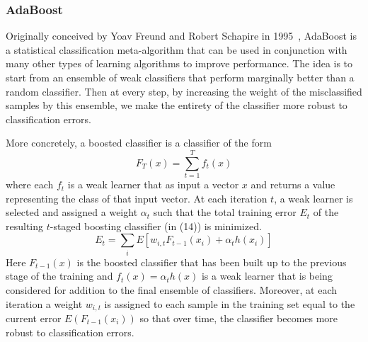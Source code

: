 \documentclass[journal,onecolumn]{IEEEtran}
\begin{document}
\subsubsection{AdaBoost}
Originally conceived by Yoav Freund and Robert Schapire in 1995~\cite{adaboost}, AdaBoost is a statistical classification meta-algorithm 
that can be used in conjunction with many other types of learning algorithms to improve performance. The idea is to start from an ensemble of 
weak classifiers that perform marginally better than a random classifier. Then at every step, by increasing the weight of the misclassified samples
by this ensemble, we make the entirety of the classifier more robust to classification errors. 

More concretely, a boosted classifier is a classifier of the form
\begin{equation}
  F_T(x) = \sum_{t=1}^T f_t(x)
\end{equation}
where each $f_t$ is a weak learner that as input a vector $x$ and returns a value representing the class of that input vector.
At each iteration $t$, a weak learner is selected and assigned a weight $\alpha_t$ such that the total training
error $E_t$ of the resulting $t$-staged boosting classifier (in (14)) is minimized.
\begin{equation}
  E_t = \sum_i E[w_{i,t} F_{t-1}(x_i) + \alpha_t h(x_i)]
\end{equation}
Here $F_{t-1}(x)$ is the boosted classifier that has been built up to the previous stage of the training and
$f_t(x) = \alpha_t h(x)$ is a weak learner that is being considered for addition to the final ensemble of classifiers.
Moreover, at each iteration a weight $w_{i,t}$ is assigned to each sample in the training set equal to the current error $E(F_{t-1}(x_i))$ 
so that over time, the classifier becomes more robust to classification errors.
\end{document}
